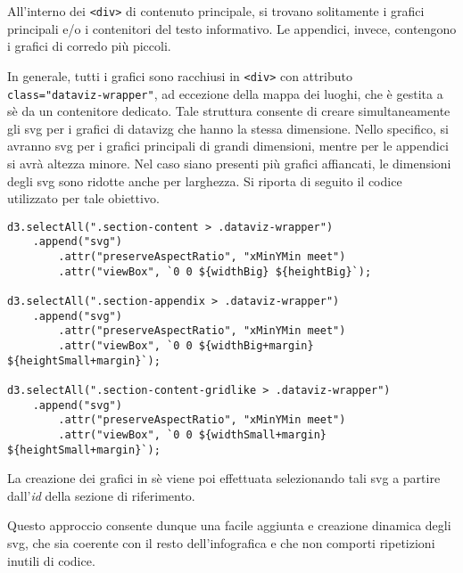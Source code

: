 All'interno dei \texttt{<div>} di contenuto principale, si trovano solitamente i grafici principali e/o i contenitori del testo informativo. Le appendici, invece, contengono i grafici di corredo più piccoli. 

In generale, tutti i grafici sono racchiusi in \texttt{<div>} con attributo \\ \texttt{class="dataviz-wrapper"}, ad eccezione della mappa dei luoghi, che è gestita a sè da un contenitore dedicato. 
Tale struttura consente di creare simultaneamente gli \gls{svg} per i grafici di \gls{datavizg} che hanno la stessa dimensione. 
Nello specifico, si avranno \gls{svg} per i grafici principali di grandi dimensioni, mentre per le appendici si avrà altezza minore. Nel caso siano presenti più grafici affiancati, le dimensioni degli \gls{svg} sono ridotte 
anche per larghezza.
Si riporta di seguito il codice utilizzato per tale obiettivo.
\begin{lstlisting}[style=htmlcssjs]
d3.selectAll(".section-content > .dataviz-wrapper")
    .append("svg")
        .attr("preserveAspectRatio", "xMinYMin meet")
        .attr("viewBox", `0 0 ${widthBig} ${heightBig}`);

d3.selectAll(".section-appendix > .dataviz-wrapper")
    .append("svg")
        .attr("preserveAspectRatio", "xMinYMin meet")
        .attr("viewBox", `0 0 ${widthBig+margin} ${heightSmall+margin}`);

d3.selectAll(".section-content-gridlike > .dataviz-wrapper")
    .append("svg")
        .attr("preserveAspectRatio", "xMinYMin meet")
        .attr("viewBox", `0 0 ${widthSmall+margin} ${heightSmall+margin}`);
\end{lstlisting}
La creazione dei grafici in sè viene poi effettuata selezionando tali \gls{svg} a partire dall'\emph{id} della sezione di riferimento. 

Questo approccio consente dunque una facile aggiunta e creazione dinamica degli \gls{svg}, che sia coerente con il resto dell'infografica
e che non comporti ripetizioni inutili di codice.

